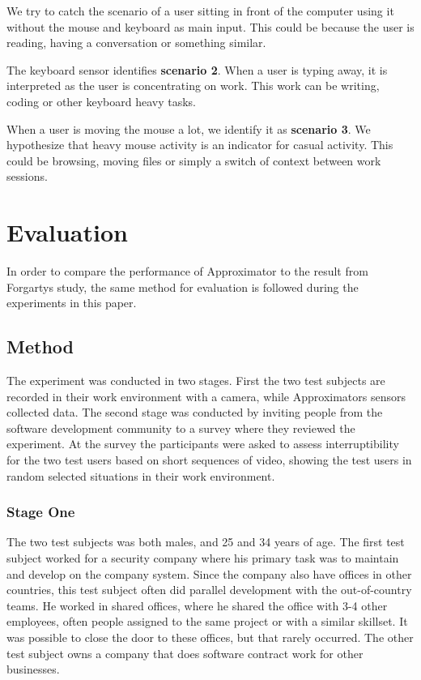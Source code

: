 \documentclass{sigchi}
\begin{document}
We try to catch the scenario of a user sitting in front of the computer using it without the mouse and keyboard as main input.
This could be because the user is reading, having a conversation or something similar.

The keyboard sensor identifies \textbf{scenario 2}.
When a user is typing away, it is interpreted as the user is concentrating on work.
This work can be writing, coding or other keyboard heavy tasks.

When a user is moving the mouse a lot, we identify it as \textbf{scenario 3}.
We hypothesize that heavy mouse activity is an indicator for casual activity.
This could be browsing, moving files or simply a switch of context between work sessions.


\section{Evaluation}
In order to compare the performance of Approximator to the result from Forgartys study, the same method for evaluation is followed during the experiments in this paper.

\subsection{Method}
\label{method}
The experiment was conducted in two stages.
First the two test subjects are recorded in their work environment with a camera, while Approximators sensors collected data.
The second stage was conducted by inviting people from the software development community to a survey where they reviewed the experiment.
At the survey the participants were asked to assess interruptibility for the two test users based on short sequences of video, showing the test users in random selected situations in their work environment.

\subsubsection{Stage One}
The two test subjects was both males, and 25 and 34 years of age.
The first test subject worked for a security company where his primary task was to maintain and develop on the company system.
Since the company also have offices in other countries, this test subject often did parallel development with the out-of-country teams.
He worked in shared offices, where he shared the office with 3-4 other employees, often people assigned to the same project or with a similar skillset.
It was possible to close the door to these offices, but that rarely occurred.
The other test subject owns a company that does software contract work for other businesses.
\end{document}
